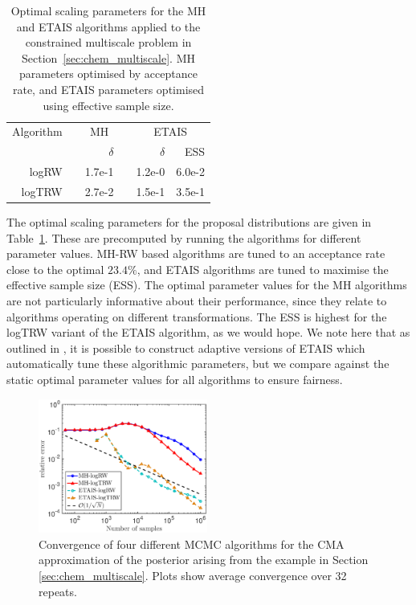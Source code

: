 \documentclass[final]{siamltex}
\newcommand{\edit}[1]{{\color{red} #1}}
\begin{document}
\begin{table}[!h]
\centering
\begin{tabular}{rrrrrr}
\toprule
	\multicolumn{1}{l}{Algorithm} & \multicolumn{3}{c}{MH} & \multicolumn{2}{c}{ETAIS} \\ \cmidrule(lr){2-4} \cmidrule(lr){5-6}
	& & $\delta$ & & $\delta$ & ESS \\ \midrule
	logRW & & 1.7e-1 & & 1.2e-0 & 6.0e-2 \\
	logTRW & & 2.7e-2 & & 1.5e-1 & 3.5e-1 \\
\bottomrule
\end{tabular}
\caption{Optimal scaling parameters for the MH and ETAIS algorithms applied to the constrained multiscale problem in Section~\ref{sec:chem_multiscale}. MH parameters optimised by acceptance rate, and ETAIS parameters optimised using effective sample size.}
\label{tab:chem_multiscale_scaling}
\end{table}

The optimal scaling parameters for the proposal distributions are
given in Table~\ref{tab:chem_multiscale_scaling}. These are
precomputed by running the algorithms for different parameter
values. MH-RW based algorithms are tuned to an acceptance rate close
to the optimal $23.4\%$, and ETAIS algorithms are tuned to maximise the
effective sample size (ESS). The optimal parameter values for the MH
algorithms are not particularly informative about their performance,
since they relate to algorithms operating on different
transformations. The ESS is highest for the logTRW variant
of the ETAIS algorithm, as we would hope. We note here that as
outlined in \cite{cotter2015parallel}, it is possible to construct
adaptive versions of ETAIS which automatically tune these algorithmic
parameters, but we compare against the static optimal parameter values
for all algorithms to ensure fairness.

\begin{figure}[!htb]
\centering
\includegraphics[width=0.495\textwidth]{"images/Applications/CMA_L2_log_space"}
\caption{Convergence of four different MCMC algorithms for the CMA
  approximation of the  posterior arising from the example in Section
  \ref{sec:chem_multiscale}. \edit{Plots show average
    convergence over 32 repeats.}}
\label{fig:chem_multiscale_L2}
\end{figure}
\end{document}
